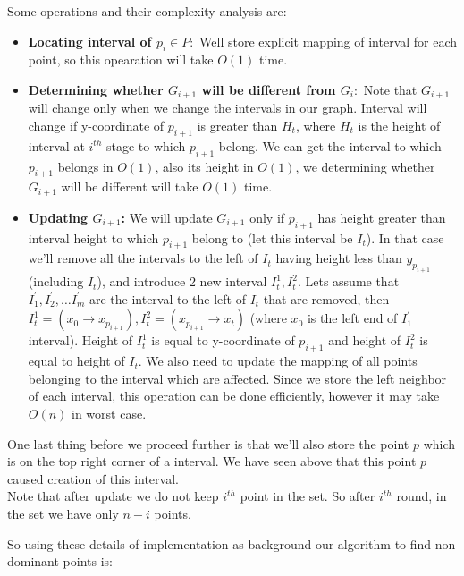 \documentclass[a4paper]{article}
\begin{document}
Some operations and their complexity analysis are:
\begin{itemize}
	\item \textbf{Locating interval of $p_i \in P: $} Well store explicit mapping of interval for each point, so this opearation will take $O(1)$ time.

	\item \textbf{Determining whether $G_{i+1}$ will be different from $G_i: $} Note that $G_{i+1}$ will change only when we change the intervals in our graph. Interval will change if y-coordinate of $p_{i+1}$  is greater than $H_{t}$, where $H_{t}$ is the height of interval at $i^{th}$ stage to which $p_{i+1}$ belong. We can get the interval to which $p_{i+1}$ belongs in $O(1)$, also its height in $O(1)$, we determining whether $G_{i+1}$ will be different will take $O(1)$ time.

	\item \textbf{Updating $G_{i+1}$: } We will update $G_{i+1}$ only if $p_{i+1}$ has height greater than interval height to which $p_{i+1}$ belong to (let this interval be $I_t$). In that case we'll remove all the intervals to the left of $I_t$ having height less than $y_{p_{i+1}}$ (including $I_t$), and introduce 2 new interval $I^1_t, I^2_t$. Lets assume that $I^{'}_1, I^{'}_2, \ldots I^{'}_m$ are the interval to the left of $I_t$ that are removed, then $I^1_t  = (x_{0} \rightarrow x_{p_{i+1}}), I^2_t = (x_{p_{i+1}} \rightarrow x_t)$ (where $x_0$ is the left end of $I^{'}_1$ interval). Height of $I^1_t$ is equal to y-coordinate of $p_{i+1}$ and height of $I^2_t$ is equal to height of $I_t$. We also need to update the mapping of all points belonging to the interval which are affected. Since we store the left neighbor of each interval, this operation can be done efficiently, however it may take $O(n)$ in worst case. 

\end{itemize}
One last thing before we proceed further is that we'll also store the point $p$ which is on the top right corner of a interval. We have seen above that this point $p$ caused creation of this interval. \\
Note that after update we do not keep $i^{th}$ point in the set. So after $i^{th}$ round, in the set we have only $n-i$ points.

\pagebreak

So using these details of implementation as background our algorithm to find non dominant points is:
\end{document}
